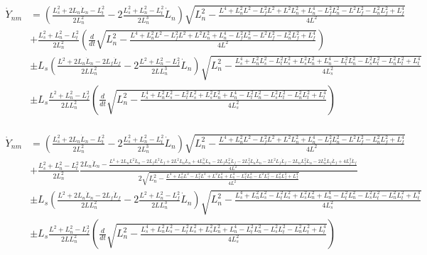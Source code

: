 \documentclass[11pt, landscape]{article}
\begin{document}
\begin{align}
  \dot{Y}_{nm} &= \left(\frac{L_{s}^2+2L_{n}\dot{L}_n - L_{t}^2}{2L^2_{n}} - 2\frac{L_{s}^2+L_{n}^2-L_{t}^2}{2L^3_{n}}\dot{L}_n\right) \sqrt{L_n^2-\frac{L^4 + L_n^2L^2 - L_f^2L^2 + L^2L_{n}^2 + L_{n}^4 - L_f^2L_{n}^2 - L^2L_{f}^2 - L_n^2L_{f}^2 + L_{f}^4}{4L^2}}\\
  &+ \frac{L_{s}^2+L_{n}^2-L_{t}^2}{2L^2_{n}} \left(\frac{d}{dt} \sqrt{L_n^2-\frac{L^4 + L_n^2L^2 - L_f^2L^2 + L^2L_{n}^2 + L_{n}^4 - L_f^2L_{n}^2 - L^2L_{f}^2 - L_n^2L_{f}^2 + L_{f}^4}{4L^2}}\right)\\
  &\pm L_s\left(\frac{L^2+2L_{n}\dot{L}_n - 2L_{f}\dot{L}_f}{2LL^2_n} - 2\frac{L^2+L_{n}^2-L_{f}^2}{2LL^3_n}\dot{L}_n\right) \sqrt{L^2_n - \frac{L_{s}^4 + L_n^2L_{s}^2 - L_t^2L_{s}^2 + L_s^2L_{n}^2 + L_{n}^4 - L_t^2L_{n}^2 - L_s^2L_{t}^2 - L_n^2L_{t}^2 + L_{t}^4}{4L^2_{s}}}\\  
  &\pm L_s\frac{L^2+L_{n}^2-L_{f}^2}{2LL^2_{n}} \left(\frac{d}{dt} \sqrt{L^2_n - \frac{L_{s}^4 + L_n^2L_{s}^2 - L_t^2L_{s}^2 + L_s^2L_{n}^2 + L_{n}^4 - L_t^2L_{n}^2 - L_s^2L_{t}^2 - L_n^2L_{t}^2 + L_{t}^4}{4L^2_{s}}}\right)\\
\end{align}

\begin{align}
  \dot{Y}_{nm} &= \left(\frac{L_{s}^2+2L_{n}\dot{L}_n - L_{t}^2}{2L^2_{n}} - 2\frac{L_{s}^2+L_{n}^2-L_{t}^2}{2L^3_{n}}\dot{L}_n\right) \sqrt{L_n^2-\frac{L^4 + L_n^2L^2 - L_f^2L^2 + L^2L_{n}^2 + L_{n}^4 - L_f^2L_{n}^2 - L^2L_{f}^2 - L_n^2L_{f}^2 + L_{f}^4}{4L^2}}\\
  &+ \frac{L_{s}^2+L_{n}^2-L_{t}^2}{2L^2_{n}}   \frac{2L_n\dot{L}_n - \frac{L^4 + 2L_nL^2\dot{L}_n - 2L_fL^2\dot{L}_f + 2L^2L_{n}\dot{L}_n + 4L_{n}^3\dot{L}_n - 2L_fL_{n}^2\dot{L}_f - 2L_f^2L_{n}\dot{L}_n - 2L^2L_{f}\dot{L}_f - 2L_nL_{f}^2\dot{L}_n - 2L_n^2L_{f}\dot{L}_f + 4L_{f}^3\dot{L}_f}{4L^2}}{2\sqrt{L_n^2-\frac{L^4 + L_n^2L^2 - L_f^2L^2 + L^2L_{n}^2 + L_{n}^4 - L_f^2L_{n}^2 - L^2L_{f}^2 - L_n^2L_{f}^2 + L_{f}^4}{4L^2}}}\\
  &\pm L_s\left(\frac{L^2+2L_{n}\dot{L}_n - 2L_{f}\dot{L}_f}{2LL^2_n} - 2\frac{L^2+L_{n}^2-L_{f}^2}{2LL^3_n}\dot{L}_n\right) \sqrt{L^2_n - \frac{L_{s}^4 + L_n^2L_{s}^2 - L_t^2L_{s}^2 + L_s^2L_{n}^2 + L_{n}^4 - L_t^2L_{n}^2 - L_s^2L_{t}^2 - L_n^2L_{t}^2 + L_{t}^4}{4L^2_{s}}}\\  
  &\pm L_s\frac{L^2+L_{n}^2-L_{f}^2}{2LL^2_{n}} \left(\frac{d}{dt} \sqrt{L^2_n - \frac{L_{s}^4 + L_n^2L_{s}^2 - L_t^2L_{s}^2 + L_s^2L_{n}^2 + L_{n}^4 - L_t^2L_{n}^2 - L_s^2L_{t}^2 - L_n^2L_{t}^2 + L_{t}^4}{4L^2_{s}}}\right)\\
\end{align}
\end{document}

